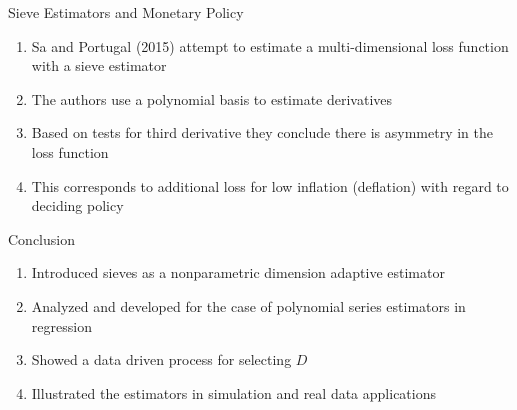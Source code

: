 \documentclass{beamer}
\begin{document}
\begin{frame}{Sieve Estimators and Monetary Policy}%
\begin{enumerate}
\item Sa and Portugal (2015) attempt to estimate a multi-dimensional loss function with a sieve estimator
\item The authors use a polynomial basis to estimate derivatives 
\item Based on tests for third derivative they conclude there is asymmetry in the loss function 
\item This corresponds to additional loss for low inflation (deflation) with regard to deciding policy
\end{enumerate}
\end{frame}
\begin{frame}{Conclusion}%
\begin{enumerate}
\item Introduced sieves as a nonparametric dimension adaptive estimator \pause
\item Analyzed and developed for the case of polynomial series estimators in regression \pause
\item Showed a data driven process for selecting $D$\pause
\item Illustrated the estimators in simulation and real data applications 
\end{enumerate}
\end{frame}
\end{document}
